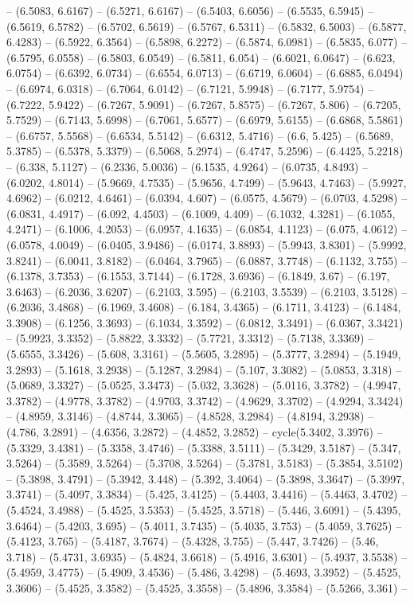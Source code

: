 -- (6.5083, 6.6167) -- (6.5271, 6.6167) -- (6.5403, 6.6056) -- (6.5535, 6.5945) -- (6.5619, 6.5782) -- (6.5702, 6.5619) -- (6.5767, 6.5311) -- (6.5832, 6.5003) -- (6.5877, 6.4283) -- (6.5922, 6.3564) -- (6.5898, 6.2272) -- (6.5874, 6.0981) -- (6.5835, 6.077) -- (6.5795, 6.0558) -- (6.5803, 6.0549) -- (6.5811, 6.054) -- (6.6021, 6.0647) -- (6.623, 6.0754) -- (6.6392, 6.0734) -- (6.6554, 6.0713) -- (6.6719, 6.0604) -- (6.6885, 6.0494) -- (6.6974, 6.0318) -- (6.7064, 6.0142) -- (6.7121, 5.9948) -- (6.7177, 5.9754) -- (6.7222, 5.9422) -- (6.7267, 5.9091) -- (6.7267, 5.8575) -- (6.7267, 5.806) -- (6.7205, 5.7529) -- (6.7143, 5.6998) -- (6.7061, 5.6577) -- (6.6979, 5.6155) -- (6.6868, 5.5861) -- (6.6757, 5.5568) -- (6.6534, 5.5142) -- (6.6312, 5.4716) -- (6.6, 5.425) -- (6.5689, 5.3785) -- (6.5378, 5.3379) -- (6.5068, 5.2974) -- (6.4747, 5.2596) -- (6.4425, 5.2218) -- (6.338, 5.1127) -- (6.2336, 5.0036) -- (6.1535, 4.9264) -- (6.0735, 4.8493) -- (6.0202, 4.8014) -- (5.9669, 4.7535) -- (5.9656, 4.7499) -- (5.9643, 4.7463) -- (5.9927, 4.6962) -- (6.0212, 4.6461) -- (6.0394, 4.607) -- (6.0575, 4.5679) -- (6.0703, 4.5298) -- (6.0831, 4.4917) -- (6.092, 4.4503) -- (6.1009, 4.409) -- (6.1032, 4.3281) -- (6.1055, 4.2471) -- (6.1006, 4.2053) -- (6.0957, 4.1635) -- (6.0854, 4.1123) -- (6.075, 4.0612) -- (6.0578, 4.0049) -- (6.0405, 3.9486) -- (6.0174, 3.8893) -- (5.9943, 3.8301) -- (5.9992, 3.8241) -- (6.0041, 3.8182) -- (6.0464, 3.7965) -- (6.0887, 3.7748) -- (6.1132, 3.755) -- (6.1378, 3.7353) -- (6.1553, 3.7144) -- (6.1728, 3.6936) -- (6.1849, 3.67) -- (6.197, 3.6463) -- (6.2036, 3.6207) -- (6.2103, 3.595) -- (6.2103, 3.5539) -- (6.2103, 3.5128) -- (6.2036, 3.4868) -- (6.1969, 3.4608) -- (6.184, 3.4365) -- (6.1711, 3.4123) -- (6.1484, 3.3908) -- (6.1256, 3.3693) -- (6.1034, 3.3592) -- (6.0812, 3.3491) -- (6.0367, 3.3421) -- (5.9923, 3.3352) -- (5.8822, 3.3332) -- (5.7721, 3.3312) -- (5.7138, 3.3369) -- (5.6555, 3.3426) -- (5.608, 3.3161) -- (5.5605, 3.2895) -- (5.3777, 3.2894) -- (5.1949, 3.2893) -- (5.1618, 3.2938) -- (5.1287, 3.2984) -- (5.107, 3.3082) -- (5.0853, 3.318) -- (5.0689, 3.3327) -- (5.0525, 3.3473) -- (5.032, 3.3628) -- (5.0116, 3.3782) -- (4.9947, 3.3782) -- (4.9778, 3.3782) -- (4.9703, 3.3742) -- (4.9629, 3.3702) -- (4.9294, 3.3424) -- (4.8959, 3.3146) -- (4.8744, 3.3065) -- (4.8528, 3.2984) -- (4.8194, 3.2938) -- (4.786, 3.2891) -- (4.6356, 3.2872) -- (4.4852, 3.2852) -- cycle(5.3402, 3.3976) -- (5.3329, 3.4381) -- (5.3358, 3.4746) -- (5.3388, 3.5111) -- (5.3429, 3.5187) -- (5.347, 3.5264) -- (5.3589, 3.5264) -- (5.3708, 3.5264) -- (5.3781, 3.5183) -- (5.3854, 3.5102) -- (5.3898, 3.4791) -- (5.3942, 3.448) -- (5.392, 3.4064) -- (5.3898, 3.3647) -- (5.3997, 3.3741) -- (5.4097, 3.3834) -- (5.425, 3.4125) -- (5.4403, 3.4416) -- (5.4463, 3.4702) -- (5.4524, 3.4988) -- (5.4525, 3.5353) -- (5.4525, 3.5718) -- (5.446, 3.6091) -- (5.4395, 3.6464) -- (5.4203, 3.695) -- (5.4011, 3.7435) -- (5.4035, 3.753) -- (5.4059, 3.7625) -- (5.4123, 3.765) -- (5.4187, 3.7674) -- (5.4328, 3.755) -- (5.447, 3.7426) -- (5.46, 3.718) -- (5.4731, 3.6935) -- (5.4824, 3.6618) -- (5.4916, 3.6301) -- (5.4937, 3.5538) -- (5.4959, 3.4775) -- (5.4909, 3.4536) -- (5.486, 3.4298) -- (5.4693, 3.3952) -- (5.4525, 3.3606) -- (5.4525, 3.3582) -- (5.4525, 3.3558) -- (5.4896, 3.3584) -- (5.5266, 3.361) -- 